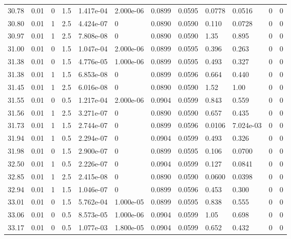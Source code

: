 \documentclass[preview]{standalone}
\begin{document}
{{{{{{\begin{tabular}{L{1.2cm}C{1.2cm} C{0.3cm}C{0.5cm} C{1.4cm}C{1.4cm} C{1.4cm}C{1.4cm} C{1.6cm}C{1.6cm} C{1.6cm}C{1.6cm}}
  30.78  &  0.01  & 0     & 1.5 &  1.417e-04  & 2.000e-06  &  0.0899&   0.0595& 0.0778 & 0.0516   &  0 & 0  \\ 
  30.80  &  0.01  & 1     & 2.5 &  4.424e-07  & 0  &  0.0890&   0.0590& 0.110 & 0.0728   &  0 & 0  \\ 
  30.97  &  0.01  & 1     & 2.5 &  7.808e-08  & 0  &  0.0890&   0.0590& 1.35 & 0.895   &  0 & 0  \\ 
  31.00  &  0.01  & 0     & 1.5 &  1.047e-04  & 2.000e-06  &  0.0899&   0.0595& 0.396 & 0.263   &  0 & 0  \\ 
  31.38  &  0.01  & 0     & 1.5 &  4.776e-05  & 1.000e-06  &  0.0899&   0.0595& 0.493 & 0.327   &  0 & 0  \\ 
  31.38  &  0.01  & 1     & 1.5 &  6.853e-08  & 0  &  0.0899&   0.0596& 0.664 & 0.440   &  0 & 0  \\ 
  31.45  &  0.01  & 1     & 2.5 &  6.016e-08  & 0  &  0.0890&   0.0590& 1.52 & 1.00   &  0 & 0  \\ 
  31.55  &  0.01  & 0     & 0.5 &  1.217e-04  & 2.000e-06  &  0.0904&   0.0599& 0.843 & 0.559   &  0 & 0  \\ 
  31.56  &  0.01  & 1     & 2.5 &  3.271e-07  & 0  &  0.0890&   0.0590& 0.657 & 0.435   &  0 & 0  \\ 
  31.73  &  0.01  & 1     & 1.5 &  2.744e-07  & 0  &  0.0899&   0.0596& 0.0106 & 7.024e-03   &  0 & 0  \\ 
  31.94  &  0.01  & 1     & 0.5 &  2.294e-07  & 0  &  0.0904&   0.0599& 0.493 & 0.326   &  0 & 0  \\ 
  31.98  &  0.01  & 0     & 1.5 &  2.900e-07  & 0  &  0.0899&   0.0595& 0.106 & 0.0700   &  0 & 0  \\ 
  32.50  &  0.01  & 1     & 0.5 &  2.226e-07  & 0  &  0.0904&   0.0599& 0.127 & 0.0841   &  0 & 0  \\ 
  32.85  &  0.01  & 1     & 2.5 &  2.415e-08  & 0  &  0.0890&   0.0590& 0.0600 & 0.0398   &  0 & 0  \\ 
  32.94  &  0.01  & 1     & 1.5 &  1.046e-07  & 0  &  0.0899&   0.0596& 0.453 & 0.300   &  0 & 0  \\ 
  33.01  &  0.01  & 0     & 1.5 &  5.762e-04  & 1.000e-05  &  0.0899&   0.0595& 0.838 & 0.555   &  0 & 0  \\ 
  33.06  &  0.01  & 0     & 0.5 &  8.573e-05  & 1.000e-06  &  0.0904&   0.0599& 1.05 & 0.698   &  0 & 0  \\ 
  33.17  &  0.01  & 0     & 0.5 &  1.077e-03  & 1.800e-05  &  0.0904&   0.0599& 0.652 & 0.432   &  0 & 0  \\ 

\end{tabular}}}}}}}
\end{document}
